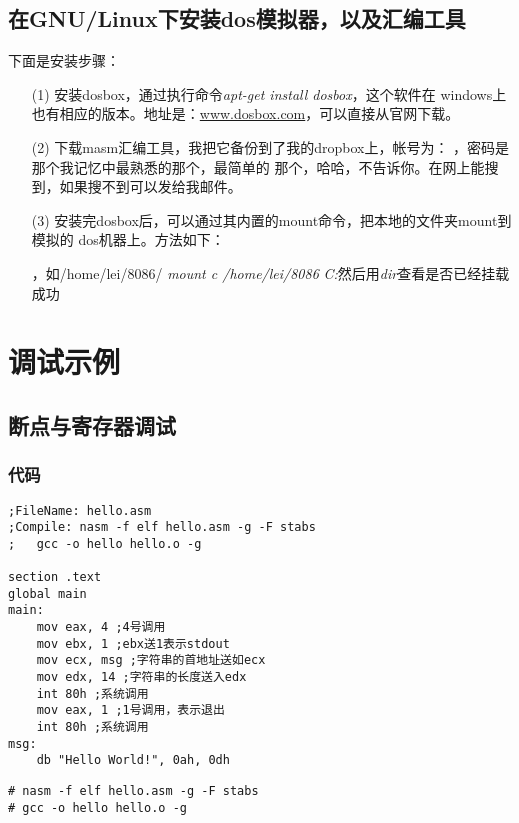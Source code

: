 \documentclass{article}
\begin{document}
\subsection{在GNU/Linux下安装dos模拟器，以及汇编工具}
下面是安装步骤：
\begin{enumerate}
\item[(1)]安装dosbox，通过执行命令\textit{apt-get install dosbox}，这个软件在
windows上也有相应的版本。地址是：\url{www.dosbox.com}，可以直接从官网下载。
\item[(2)]下载masm汇编工具，我把它备份到了我的dropbox上，帐号为：
，密码是那个我记忆中最熟悉的那个，最简单的
那个，哈哈，不告诉你。在网上能搜到，如果搜不到可以发给我邮件。
\item[(3)]安装完dosbox后，可以通过其内置的mount命令，把本地的文件夹mount到模拟的
dos机器上。方法如下：
\begin{enumerate}
，如/home/lei/8086/
\textit{mount c /home/lei/8086}
\textit{C:}然后用\textit{dir}查看是否已经挂载成功 
\end{enumerate}
\end{enumerate}

\section{调试示例}
\subsection{断点与寄存器调试}
\subsubsection{代码}
\begin{verbatim}
;FileName: hello.asm
;Compile: nasm -f elf hello.asm -g -F stabs
;	gcc -o hello hello.o -g

section .text
global main
main:
	mov eax, 4 ;4号调用
	mov ebx, 1 ;ebx送1表示stdout
	mov ecx, msg ;字符串的首地址送如ecx
	mov edx, 14 ;字符串的长度送入edx
	int 80h ;系统调用
	mov eax, 1 ;1号调用，表示退出
	int 80h ;系统调用
msg:
	db "Hello World!", 0ah, 0dh
\end{verbatim}

\begin{verbatim}
# nasm -f elf hello.asm -g -F stabs
# gcc -o hello hello.o -g
\end{verbatim}
\end{document}
